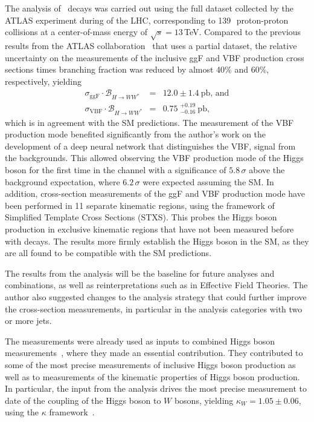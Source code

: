 The analysis of \HWW\ decays was carried out using the full dataset collected by the ATLAS experiment during \RunTwo of the LHC, corresponding to 139\,\ifb\ proton-proton collisions at a center-of-mass energy of $\sqrt{s} = 13\,$TeV. 
Compared to the previous results from the ATLAS collaboration~\cite{HIGG-2016-07} that uses a partial \RunTwo dataset, the relative uncertainty on the measurements of the inclusive ggF and VBF production cross sections times branching fraction was reduced by almost 40\% and 60\%, respectively, yielding 
\begin{eqnarray*}
    \sigma_{\mathrm{ggF}} \cdot \mathcal{B}_{H \to WW^{\ast}} &=& 12.0 \pm 1.4~\mathrm{pb}, \,\text{and} \\
    \sigma_{\mathrm{VBF}} \cdot \mathcal{B}_{H \to WW^{\ast}} &=& 0.75\;^{+0.19}_{-0.16}~\mathrm{pb},
\end{eqnarray*}
which is in agreement with the SM predictions.
The measurement of the VBF production mode benefited significantly from the author's work on the development of a deep neural network that distinguishes the VBF, \HWW signal from the backgrounds.
This allowed observing the VBF production mode of the Higgs boson for the first time in the \HWW channel with a significance of $5.8\,\sigma$ above the background expectation, where $6.2\,\sigma$ were expected assuming the SM.
In addition, cross-section measurements of the ggF and VBF production mode have been performed in 11 separate kinematic regions, using the framework of Simplified Template Cross Sections (STXS). This probes the Higgs boson production in exclusive kinematic regions that have not been measured before with \HWW decays.
The results more firmly establish the Higgs boson in the SM, as they are all found to be compatible with the SM predictions.

The results from the \HWW analysis will be the baseline for future analyses and combinations, as well as reinterpretations such as in Effective Field Theories.
The author also suggested changes to the analysis strategy that could further improve the \HWW cross-section measurements, in particular in the analysis categories with two or more jets.

The measurements were already used as inputs to combined Higgs boson measurements~\cite{NaturePaper}, where they made an essential contribution. 
They contributed to some of the most precise measurements of inclusive Higgs boson production as well as to measurements of the kinematic properties of Higgs boson production.
In particular, the input from the \HWW analysis drives the most precise measurement to date of the coupling of the Higgs boson to $W$ bosons, yielding $\kappa_{W} = 1.05 \pm 0.06$, using the $\kappa$ framework~\cite{LHCHandbookV3}.

